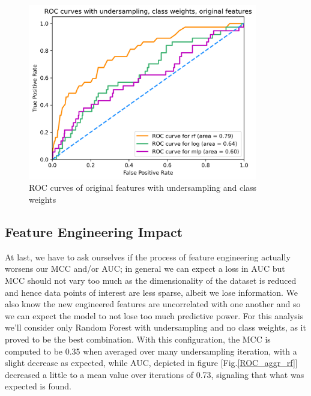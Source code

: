 \documentclass[a4paper,11pt]{article}
\begin{document}
\begin{figure}[H]
  \centering
        \includegraphics[width=10cm]{ROC_under_weights.png}
 \caption{ROC curves of original features with undersampling and class weights}
 \label{ROC_under_weights}
\end{figure}

\subsection{Feature Engineering Impact}

At last, we have to ask ourselves if the process of feature engineering actually worsens our MCC and/or AUC; in general we can expect a loss in AUC but MCC should not vary too much as the dimensionality of the dataset is reduced and hence data points of interest are less sparse, albeit we lose information. We also know the new engineered features are uncorrelated with one another and so we can expect the model to not lose too much predictive power. For this analysis we'll consider only Random Forest with undersampling and no class weights, as it proved to be the best combination. With this configuration, the MCC is computed to be 0.35 when averaged over many undersampling iteration, with a slight decrease as expected, while AUC, depicted in figure [Fig.\ref{ROC_aggr_rf}] decreased a little to a mean value over iterations of 0.73, signaling that what was expected is found. 
\end{document}
